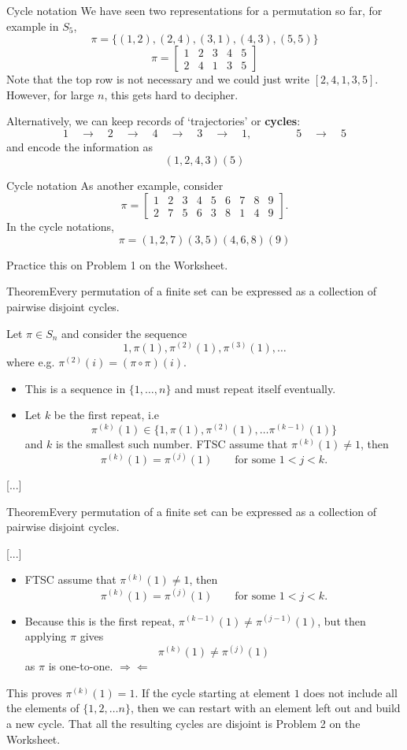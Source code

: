 \documentclass{beamer}
\def\bl[#1]#2{\begin{block}{#1}#2\end{block}}
\def\itemb{\begin{itemize}}
\def\iteme{\end{itemize}}
\begin{document}
\begin{frame}{Cycle notation}
We have seen two representations for a permutation so far, for example in $S_5$,
\[
\pi=\{(1,2),(2,4),(3,1),(4,3),(5,5)\}
\]\vspace{-0.3cm}
\[
\pi=\left[\begin{array}{ccccc}
1&2&3&4&5\\
2&4&1&3&5
\end{array}\right]
\]
Note that the top row is not necessary and we could just write $[2, 4, 1, 3, 5]$. However, for large $n$, this gets hard to decipher.
\vspace{0.5cm}

Alternatively, we can keep records of `trajectories' or \textbf{cycles}:
\[
1\quad\to\quad 2\quad \to \quad 4\quad \to\quad 3\quad\to \quad 1,\qquad\qquad 5\quad\to\quad 5
\]
and encode the information as
\[
(1,2,4,3) (5)
\]
\end{frame}

\begin{frame}{Cycle notation}
As another example, consider
\[
\pi=\left[\begin{array}{ccccccccc}
1&2&3&4&5&6&7&8&9\\
2&7&5&6&3&8&1&4&9
\end{array}\right].
\]
In the cycle notations,
\[
\pi=(1,2,7)(3,5)(4,6,8)(9)
\]

\center Practice this on Problem 1 on the Worksheet.

\end{frame}

\begin{frame}
\bl[Theorem]{Every permutation of a finite set can be expressed as a collection of pairwise disjoint cycles.}
Let $\pi\in S_n$ and consider the sequence
\[
1,\pi(1),\pi^{(2)}(1),\pi^{(3)}(1),\dots
\]
where e.g. $\pi^{(2)}(i)=(\pi\circ\pi)(i)$. 
\itemb
\item This is a sequence in $\{1,\dots, n\}$ and must repeat itself eventually.
\item Let $k$ be the first repeat, i.e
\[
\pi^{(k)}(1)\in \{1,\pi(1),\pi^{(2)}(1),\dots\pi^{(k-1)}(1)\}
\]
and $k$ is the smallest such number. FTSC assume that $\pi^{(k)}(1)\neq 1$, then
\[
\pi^{(k)}(1)=\pi^{(j)}(1)\qquad \textrm{for some }1<j<k.
\]
\iteme
[...]
\end{frame}

\begin{frame}
\bl[Theorem]{Every permutation of a finite set can be expressed as a collection of pairwise disjoint cycles.}
[...]
\itemb
\item FTSC assume that $\pi^{(k)}(1)\neq 1$, then
\[
\pi^{(k)}(1)=\pi^{(j)}(1)\qquad \textrm{for some }1<j<k.
\]
\item Because this is the first repeat, $\pi^{(k-1)}(1)\neq\pi^{(j-1)}(1)$, but then applying $\pi$ gives
\[
\pi^{(k)}(1)\neq \pi^{(j)}(1)
\]
as $\pi$ is one-to-one. $\Rightarrow\Leftarrow$
\iteme
This proves $\pi^{(k)}(1)=1$. If the cycle starting at element $1$ does not include all the elements of $\{1,2,\dots n\}$, then we can restart with an element left out and build a new cycle. That all the resulting cycles are disjoint is Problem 2 on the Worksheet.
\end{frame}
\end{document}
